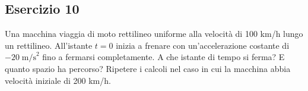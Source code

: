 \documentclass[12pt,a4paper]{book}
\begin{document}


\subsection*{Esercizio 10}
Una macchina viaggia di moto rettilineo uniforme alla velocità di 100 km/h lungo un rettilineo. All'istante $t=0$ inizia a frenare con un'accelerazione costante di $-20\;\text{m/s}^2$  fino a fermarsi completamente. A che istante di tempo si ferma? E quanto spazio ha percorso? Ripetere i calcoli nel caso in cui la macchina abbia velocità iniziale di 200 km/h.
\end{document}

